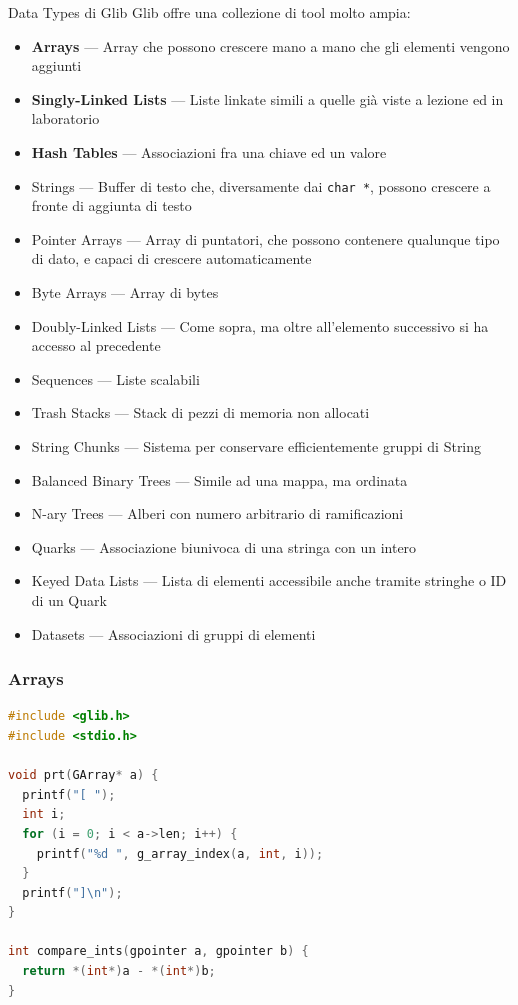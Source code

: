 \documentclass{beamer}
\begin{document}
\begin{frame}{Data Types di Glib}
Glib offre una collezione di tool molto ampia:
\begin{itemize}
 \item \textbf{Arrays} --- Array che possono crescere mano a mano che gli elementi vengono aggiunti
 \item \textbf{Singly-Linked Lists} --- Liste linkate simili a quelle già viste a lezione ed in laboratorio
 \item \textbf{Hash Tables} --- Associazioni fra una chiave ed un valore
\end{itemize}
\begin{itemize}
\scriptsize
 \item Strings --- Buffer di testo che, diversamente dai \texttt{char *}, possono crescere a fronte di aggiunta di testo
 \item Pointer Arrays --- Array di puntatori, che possono contenere qualunque tipo di dato, e capaci di crescere automaticamente
 \item Byte Arrays --- Array di bytes
 \item Doubly-Linked Lists --- Come sopra, ma oltre all'elemento successivo si ha accesso al precedente
 \item Sequences --- Liste scalabili
 \item Trash Stacks --- Stack di pezzi di memoria non allocati
 \item String Chunks --- Sistema per conservare efficientemente gruppi di String
 \item Balanced Binary Trees --- Simile ad una mappa, ma ordinata
 \item N-ary Trees --- Alberi con numero arbitrario di ramificazioni
 \item Quarks --- Associazione biunivoca di una stringa con un intero
 \item Keyed Data Lists --- Lista di elementi accessibile anche tramite stringhe o ID di un Quark
 \item Datasets --- Associazioni di gruppi di elementi
\end{itemize}
\end{frame}

\begin{frame}[fragile]
\frametitle{Arrays}
\begin{lstlisting}[language=C]
#include <glib.h>
#include <stdio.h>

void prt(GArray* a) {
  printf("[ ");
  int i;
  for (i = 0; i < a->len; i++) {
    printf("%d ", g_array_index(a, int, i));
  }
  printf("]\n");
}

int compare_ints(gpointer a, gpointer b) {
  return *(int*)a - *(int*)b;
}
\end{lstlisting}
\end{frame}
\end{document}
